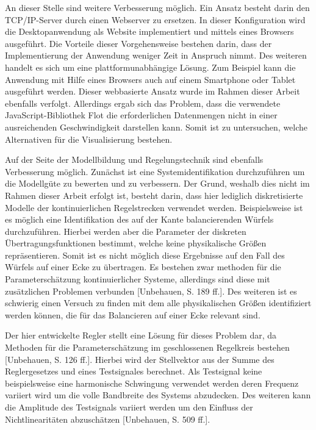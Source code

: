 An dieser Stelle sind weitere Verbesserung möglich. Ein Ansatz besteht darin den TCP/IP-Server durch einen Webserver zu ersetzen. In dieser Konfiguration wird die Desktopanwendung als Website implementiert und mittels eines Browsers ausgeführt. Die Vorteile dieser Vorgehensweise bestehen darin, dass der Implementierung der Anwendung weniger Zeit in Anspruch nimmt. Des weiteren handelt es sich um eine plattformunabhängige Lösung. Zum Beispiel kann die Anwendung mit Hilfe eines Browsers auch auf einem Smartphone oder Tablet ausgeführt werden. Dieser webbasierte Ansatz wurde im Rahmen dieser Arbeit ebenfalls verfolgt. Allerdings ergab sich das Problem, dass die verwendete JavaScript-Bibliothek Flot die erforderlichen Datenmengen nicht in einer ausreichenden Geschwindigkeit darstellen kann. Somit ist zu untersuchen, welche Alternativen für die Visualisierung bestehen.

Auf der Seite der Modellbildung und Regelungstechnik sind ebenfalls Verbesserung möglich. Zunächst ist eine Systemidentifikation durchzuführen um die Modellgüte zu bewerten und zu verbessern. Der Grund, weshalb dies nicht im Rahmen dieser Arbeit erfolgt ist, besteht darin, dass hier lediglich diskretisierte Modelle der kontinuierlichen Regelstrecken verwendet werden. Beispielsweise ist es möglich eine Identifikation des auf der Kante balancierenden Würfels durchzuführen. Hierbei werden aber die Parameter der diskreten Übertragungsfunktionen bestimmt, welche keine physikalische Größen repräsentieren. Somit ist es nicht möglich diese Ergebnisse auf den Fall des Würfels auf einer Ecke zu übertragen. Es bestehen zwar methoden für die Parameterschätzung kontinuierlicher Systeme, allerdings sind diese mit zusätzlichen Problemen verbunden [Unbehauen, S. 189 ff.]. Des weiteren ist es schwierig einen Versuch zu finden mit dem alle physikalischen Größen identifiziert werden können, die für das Balancieren auf einer Ecke relevant sind.

Der hier entwickelte Regler stellt eine Lösung für dieses Problem dar, da Methoden für die Parameterschätzung im geschlossenen Regelkreis bestehen [Unbehauen, S. 126 ff.]. Hierbei wird der Stellvektor aus der Summe des Reglergesetzes und eines Testsignales berechnet. Als Testsignal keine beispielsweise eine harmonische Schwingung verwendet werden deren Frequenz variiert wird um die volle Bandbreite des Systems abzudecken. Des weiteren kann die Amplitude des Testsignals variiert werden um den Einfluss der Nichtlinearitäten abzuschätzen [Unbehauen, S. 509 ff.].

